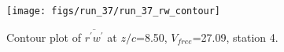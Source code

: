 \begin{figure}[H]
\centering
\texttt{[image: figs/run\_37/run\_37\_rw\_contour]}
\caption{Contour plot of $\overline{r^\prime w^\prime}$ at $z/c$=8.50, $V_{free}$=27.09, station 4.}
\label{fig:run_37_rw_contour}
\end{figure}


